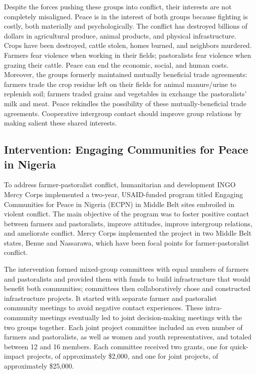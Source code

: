\documentclass[11pt]{article}
\begin{document}
Despite the forces pushing these groups into conflict, their interests
are not completely misaligned. Peace is in the interest of both groups
because fighting is costly, both materially and psychologically. The
conflict has destroyed billions of dollars in agricultural produce,
animal products, and physical infrastructure. Crops have been destroyed,
cattle stolen, homes burned, and neighbors murdered. Farmers fear
violence when working in their fields; pastoralists fear violence when
grazing their cattle. Peace can end the economic, social, and human
costs. Moreover, the groups formerly maintained mutually beneficial
trade agreements: farmers trade the crop residue left on their fields
for animal manure/urine to replenish soil; farmers traded grains and
vegetables in exchange the pastoralists' milk and meat. Peace rekindles
the possibility of these mutually-beneficial trade agreements.
Cooperative intergroup contact should improve group relations by making
salient these shared interests.

\hypertarget{intervention-engaging-communities-for-peace-in-nigeria}{%
\subsection{Intervention: Engaging Communities for Peace in
Nigeria}\label{intervention-engaging-communities-for-peace-in-nigeria}}

To address farmer-pastoralist conflict, humanitarian and development
INGO Mercy Corps implemented a two-year, USAID-funded program titled
Engaging Communities for Peace in Nigeria (ECPN) in Middle Belt sites
embroiled in violent conflict. The main objective of the program was to
foster positive contact between farmers and pastoralists, improve
attitudes, improve intergroup relations, and ameliorate conflict. Mercy
Corps implemented the project in two Middle Belt states, Benue and
Nassarawa, which have been focal points for farmer-pastoralist conflict.

The intervention formed mixed-group committees with equal numbers of
farmers and pastoralists and provided them with funds to build
infrastructure that would benefit both communities; committees then
collaboratively chose and constructed infrastructure projects. It
started with separate farmer and pastoralist community meetings to avoid
negative contact experiences. These intra-community meetings eventually
led to joint decision-making meetings with the two groups together. Each
joint project committee included an even number of farmers and
pastoralists, as well as women and youth representatives, and totaled
between 12 and 16 members. Each committee received two grants, one for
quick-impact projects, of approximately \$2,000, and one for joint
projects, of approximately \$25,000.
\end{document}
